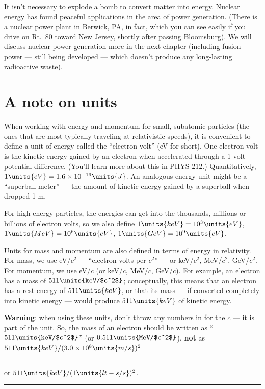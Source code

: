 \begin{itemize}
It isn't necessary to explode a bomb to convert matter into energy.
Nuclear energy has found peaceful applications in the area of power
generation. (There is a nuclear power plant in Berwick, PA, in fact,
which you can see easily if you drive on Rt.~80 toward New Jersey,
shortly after passing Bloomsburg).  We will discuss nuclear power
generation more in the next chapter (including fusion power ---  still
being developed --- which doesn't produce any long-lasting radioactive
waste).

\end{itemize}

\section{A note on units}
\label{section:rel-units}

When working with energy and momentum for small, subatomic particles
(the ones that are most typically traveling at relativistic speeds),
it is convenient to define a unit of energy called the ``electron
volt'' (eV for short).  One electron volt is the kinetic energy gained
by an electron when accelerated through a 1 volt potential difference.
(You'll learn more about this in PHYS 212.)  Quantitatively, $1\units{eV} =
1.6\times 10^{-19}\units{J}$.  An analogous energy unit might be a
``superball-meter'' --- the amount of kinetic energy gained by a
superball when dropped 1 m.
    
For high energy particles, the energies can get into the thousands,
millions or billions of electron volts, so we also define 
$1\units{keV} = 10^3\units{eV}$, $1\units{MeV} = 10^6\units{eV}$,
$1\units{GeV} = 10^9\units{eV}$.
    
Units for mass and momentum are also defined in terms of energy in
relativity.  For mass, we use eV/$c^2$ --- ``electron volts per
$c^2$'' --- or keV/$c^2$, MeV/$c^2$, GeV/$c^2$.  For momentum, we use
eV/$c$ (or keV/$c$, MeV/$c$, GeV/$c$).  For example, an electron has a
mass of $511\units{keV/$c^2$}$; conceptually, this means that an electron 
has a rest energy of $511\units{keV}$, or that its mass --- if converted 
completely into kinetic energy --- would produce $511\units{keV}$ of 
kinetic energy.
  
{\bf Warning}: when using these units, don't throw any numbers in for
the $c$ --- it is part of the unit.  So, the mass of an electron
should be written as ``$511\units{keV/$c^2$}$'' (or $0.511\units{MeV/$c^2$}$), 
{\bf not} as $511\units{keV}/(3.0\times 10^8\units{m/s})^2$ \hspace{-1.7in}\rule[1mm]{42mm}{.2mm} 
or $511\units{keV}/(1\units{lt-s/s})^2$.\hspace{-1.25in}\rule[1mm]{30mm}{.2mm}
\newpage

